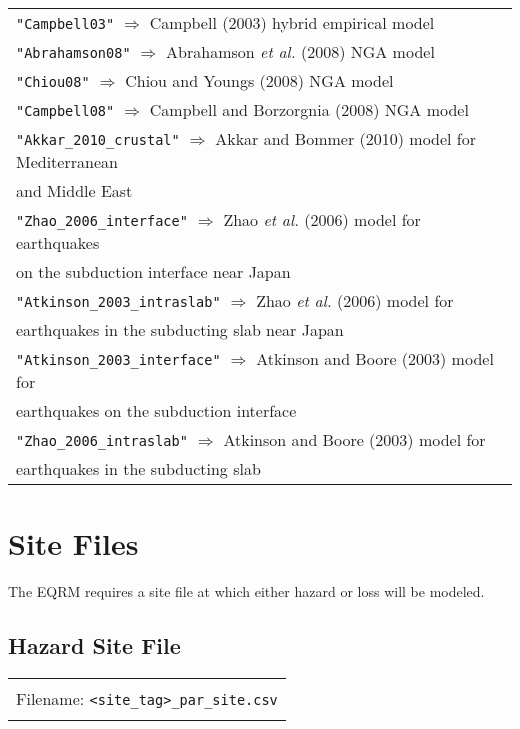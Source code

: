\begin{tabular}{|p{\textwidth}|}
\texttt{"Campbell03"} $\Rightarrow$ Campbell (2003) hybrid empirical model\\
\texttt{"Abrahamson08"} $\Rightarrow$ Abrahamson \textit{et al.} (2008) NGA model\\
\texttt{"Chiou08"} $\Rightarrow$ Chiou and Youngs (2008) NGA model \\
\texttt{"Campbell08"} $\Rightarrow$ Campbell and Borzorgnia (2008) NGA model \\
\texttt{"Akkar\_2010\_crustal"} $\Rightarrow$ Akkar and Bommer (2010) model for Mediterranean \\
    \hspace{8em} and Middle East\\
\texttt{"Zhao\_2006\_interface"} $\Rightarrow$ Zhao \textit{et al.} (2006) model for earthquakes \\
    \hspace{8em} on the subduction interface near Japan \\
\texttt{"Atkinson\_2003\_intraslab"} $\Rightarrow$ Zhao \textit{et al.} (2006) model for \\
    \hspace{8em} earthquakes in the subducting slab near Japan\\
\texttt{"Atkinson\_2003\_interface"} $\Rightarrow$ Atkinson and Boore (2003) model for \\
    \hspace{8em} earthquakes on the subduction interface\\
\texttt{"Zhao\_2006\_intraslab"} $\Rightarrow$ Atkinson and Boore (2003) model for \\
    \hspace{8em} earthquakes in the subducting slab \\
\hline
\end{tabular}



\section{Site Files}


The EQRM requires a site file at which either hazard or loss will be modeled.

\subsection{Hazard Site File}

\begin{center}
\begin{tabular}{|c|}
\hline
\\
Filename: \texttt{<site\_tag>\_par\_site.csv} \\
\\
\hline
\end{tabular}
\end{center}

